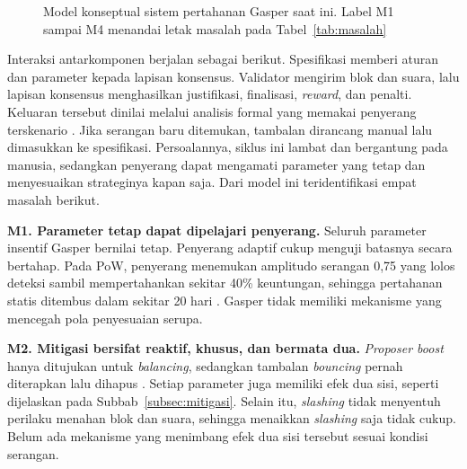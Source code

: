 \begin{figure}[htbp]
\caption{Model konseptual sistem pertahanan Gasper saat ini. Label M1 sampai M4 menandai letak masalah pada Tabel~\ref{tab:masalah}}
\label{fig:kondisi_saat_ini}
\end{figure}

Interaksi antarkomponen berjalan sebagai berikut. Spesifikasi memberi aturan dan parameter kepada lapisan konsensus. Validator mengirim blok dan suara, lalu lapisan konsensus menghasilkan justifikasi, finalisasi, \textit{reward}, dan penalti. Keluaran tersebut dinilai melalui analisis formal yang memakai penyerang terskenario \parencite{laneve2025stochastic}. Jika serangan baru ditemukan, tambalan dirancang manual lalu dimasukkan ke spesifikasi. Persoalannya, siklus ini lambat dan bergantung pada manusia, sedangkan penyerang dapat mengamati parameter yang tetap dan menyesuaikan strateginya kapan saja. Dari model ini teridentifikasi empat masalah berikut.

\textbf{M1. Parameter tetap dapat dipelajari penyerang.} Seluruh parameter insentif Gasper bernilai tetap. Penyerang adaptif cukup menguji batasnya secara bertahap. Pada PoW, penyerang menemukan amplitudo serangan 0,75 yang lolos deteksi sambil mempertahankan sekitar 40\% keuntungan, sehingga pertahanan statis ditembus dalam sekitar 20 hari \parencite{skowronski2026adaptive}. Gasper tidak memiliki mekanisme yang mencegah pola penyesuaian serupa.

\textbf{M2. Mitigasi bersifat reaktif, khusus, dan bermata dua.} \textit{Proposer boost} hanya ditujukan untuk \textit{balancing}, sedangkan tambalan \textit{bouncing} pernah diterapkan lalu dihapus \parencite{laneve2025stochastic}. Setiap parameter juga memiliki efek dua sisi, seperti dijelaskan pada Subbab~\ref{subsec:mitigasi}. Selain itu, \textit{slashing} tidak menyentuh perilaku menahan blok dan suara, sehingga menaikkan \textit{slashing} saja tidak cukup. Belum ada mekanisme yang menimbang efek dua sisi tersebut sesuai kondisi serangan.


